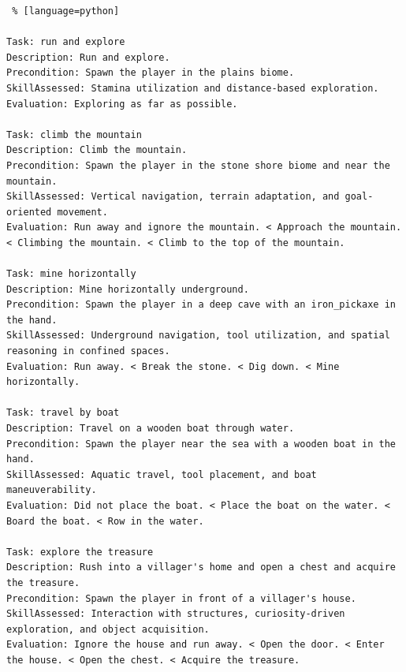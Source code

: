 \begin{lstlisting} % [language=python]  

Task: run and explore
Description: Run and explore. 
Precondition: Spawn the player in the plains biome. 
SkillAssessed: Stamina utilization and distance-based exploration.
Evaluation: Exploring as far as possible. 

Task: climb the mountain
Description: Climb the mountain. 
Precondition: Spawn the player in the stone shore biome and near the mountain. 
SkillAssessed: Vertical navigation, terrain adaptation, and goal-oriented movement.
Evaluation: Run away and ignore the mountain. < Approach the mountain. < Climbing the mountain. < Climb to the top of the mountain. 

Task: mine horizontally
Description: Mine horizontally underground. 
Precondition: Spawn the player in a deep cave with an iron_pickaxe in the hand. 
SkillAssessed: Underground navigation, tool utilization, and spatial reasoning in confined spaces.
Evaluation: Run away. < Break the stone. < Dig down. < Mine horizontally. 

Task: travel by boat
Description: Travel on a wooden boat through water. 
Precondition: Spawn the player near the sea with a wooden boat in the hand. 
SkillAssessed: Aquatic travel, tool placement, and boat maneuverability.
Evaluation: Did not place the boat. < Place the boat on the water. < Board the boat. < Row in the water. 

Task: explore the treasure
Description: Rush into a villager's home and open a chest and acquire the treasure. 
Precondition: Spawn the player in front of a villager's house. 
SkillAssessed: Interaction with structures, curiosity-driven exploration, and object acquisition.
Evaluation: Ignore the house and run away. < Open the door. < Enter the house. < Open the chest. < Acquire the treasure. 

\end{lstlisting}


